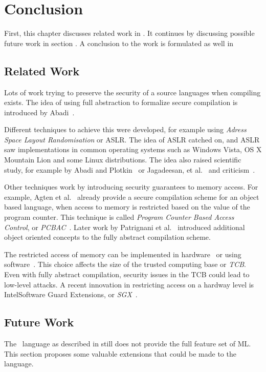 \chapter{Conclusion}
\label{chap:conclusion}
First, this chapter discusses related work in .
It continues by discussing possible future work in section .
A conclusion to the work is formulated as well in 

\section{Related Work}
\label{sec:relatedwork}
Lots of work trying to preserve the security of a source languages when compiling exists.
The idea of using full abstraction to formalize secure compilation is introduced by Abadi~\cite{Abadi}.

Different techniques to achieve this were developed, for example using \emph{Adress Space Layout Randomisation} or ASLR.%
The idea of ASLR catched on, and ASLR saw implementations in common operating systems such as Windows Vista, OS X Mountain Lion and some Linux distributions. 
The idea also raised scientific study, for example by Abadi and Plotkin~\cite{AbadiASLR} or Jagadeesan, et al.~\cite{Jagadeesan} and criticism~\cite{Shacham:2004:EAR:1030083.1030124,Strackx:2009:BMS:1519144.1519145}.

Other techniques work by introducing security guarantees to memory access.
For example, Agten et al.~\cite{Agten:2012:SCM:2354412.2355247} already provide a secure compilation scheme for an object based language, when access to memory is restricted based on the value of the program counter. This technique is called \emph{Program Counter Based Access Control}, or \emph{PCBAC}~\cite{PCBAC}.
Later work by Patrignani et al.~\cite{Patrignani} introduced additional object oriented concepts to the fully abstract compilation scheme.

The restricted access of memory can be implemented in hardware~\cite{Sancus,SGX} or using software~\cite{Fides,Salus}.
This choice affects the size of the trusted computing base or \emph{TCB}.
Even with fully abstract compilation, security issues in the TCB could lead to low-level attacks.
A recent innovation in restricting access on a hardway level is Intel\textregistered Software Guard Extensions, or \emph{SGX}~\cite{SGX}.

\section{Future Work}
\label{sec:FutureWork}
The \MiniML\ language as described in  still does not provide the full feature set of ML. This section proposes some valuable extensions that could be made to the language.

